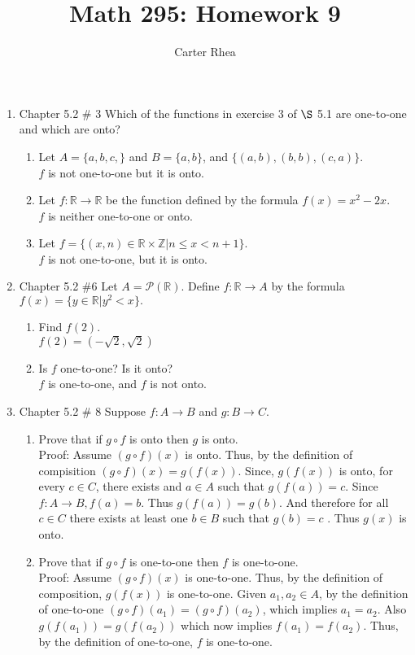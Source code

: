 \documentclass[10pt,a4paper]{article}
\author{Carter Rhea}
\title{Math 295: Homework 9}
\begin{document}
\maketitle
\begin{enumerate}
\item Chapter 5.2 $\#$ 3 Which of the functions in exercise 3 of $\S$ 5.1 are one-to-one and which are onto?\\
\begin{enumerate}
\item Let $A=\{a,b,c,\}$ and $B=\{a,b\}$, and $\{(a,b),(b,b),(c,a)\}$.\\
$f$ is not one-to-one but it is onto.
\item Let $f : \mathbb{R} \to \mathbb{R}$ be the function defined by the formula $f(x)= x^2 - 2x$.\\
$f$ is neither one-to-one or onto.
\item Let $f= \{(x,n) \in \mathbb{R} \times \mathbb{Z} | n \leq x < n+1 \}$.\\
$f$ is not one-to-one, but it is onto.
\end{enumerate}
\item Chapter 5.2 \#6 Let $A = \mathcal{P}(\mathbb{R})$. Define $f : \mathbb{R} \to A$ by the formula $f(x) = \{y \in \mathbb{R} | y^2 <x  \}.$
\begin{enumerate}
\item Find $f(2)$.\\
$f(2) = (-\sqrt{2},\sqrt{2})$
\item Is $f$ one-to-one? Is it onto?\\
$f$ is  one-to-one, and $f$ is not onto.
\end{enumerate}
\item Chapter 5.2 \# 8 Suppose $f : A \to B$ and $g : B \to C$. 
\begin{enumerate}
\item Prove that if $g \circ f$ is onto then $g$ is onto.\\
Proof: Assume $(g \circ f)(x)$ is onto. Thus, by the definition of compisition  $(g\circ f)(x)= g(f(x))$. Since, $g(f(x))$ is onto, for every $c \in C$, there exists and $a \in A$ such that $g(f(a))=c$. Since $f :A \to B, f(a)=b$. Thus $g(f(a))=g(b)$. And therefore for all $c \in C$ there exists at least one $b \in B$ such that $g(b)=c$  . Thus $g(x)$ is onto.
\item Prove that if $g \circ f$ is one-to-one then $f$ is one-to-one.\\
Proof: Assume $(g \circ f)(x)$ is one-to-one. Thus, by the definition of composition, $g(f(x))$ is one-to-one. Given $a_1 , a_2 \in A$, by the definition of one-to-one $(g \circ f)(a_1)=(g \circ f)(a_2)$, which implies $a_1=a_2$. Also $g(f(a_1))=g(f(a_2))$ which now implies $f(a_1)=f(a_2)$. Thus, by the definition of one-to-one, $f$ is one-to-one.

\end{enumerate}
\end{enumerate}
\end{document}
